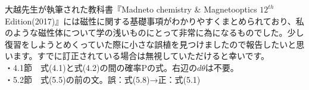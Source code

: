 \documentclass{jsarticle}
\begin{document}
\quad 大越先生が執筆された教科書『Madneto chemistry \& Magnetooptics $12^{th}$ Edition(2017)』には磁性に関する基礎事項がわかりやすくまとめられており、私のような磁性体について学の浅いものにとって非常に為になるものでした。少し復習をしようとめくっていた際に小さな誤植を見つけましたので報告したいと思います。すでに訂正されている場合は無視していただけると幸いです。\\
・4.1節　式(4.1)と式(4.2)の間の確率Pの式。右辺の$d\theta$は不要。\\
・5.2節　式(5.5)の前の文。誤：式(5.8)→正：式(5.1)
\end{document}
